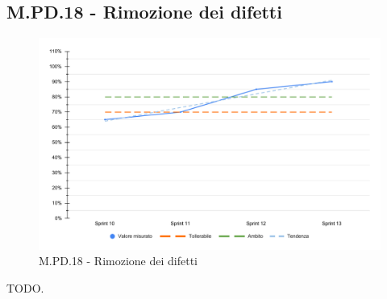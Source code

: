 \subsection{M.PD.18 - Rimozione dei difetti}

\begin{figure}[H]
  \centering
  \includegraphics[width=\textwidth]{assets/rimozione_difetti.pdf}
  \caption{M.PD.18 - Rimozione dei difetti}
\end{figure}

\par TODO.